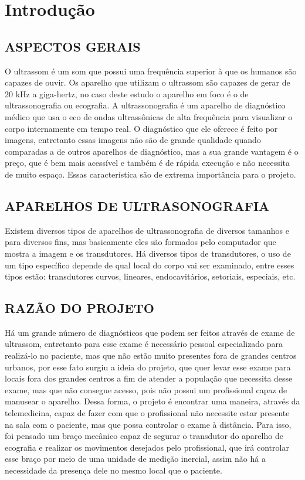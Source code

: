 \chapter{Introdução}

\section{ASPECTOS GERAIS}
O ultrassom é um som que possui uma frequência superior à que os humanos são capazes de ouvir. Os aparelho que utilizam o ultrassom são capazes de gerar de 20 kHz a giga-hertz, no caso deste estudo o aparelho em foco é o de ultrassonografia ou ecografia.
A ultrassonografia é um aparelho de diagnóstico médico que usa o eco de ondas ultrassônicas de alta frequência para visualizar o corpo internamente em tempo real. O diagnóstico que ele oferece é feito por imagens, entretanto essas imagens não são de grande qualidade quando comparadas a de outros aparelhos de diagnóstico, mas a sua grande vantagem é o preço, que é bem mais acessível e também é de rápida execução e não necessita de muito espaço. Essas característica são de extrema importância para o projeto.

\section{APARELHOS DE ULTRASONOGRAFIA}
Existem diversos tipos de aparelhos de ultrassonografia de diversos tamanhos e para diversos fins, mas basicamente eles são formados pelo computador que mostra a imagem e os transdutores. Há diversos tipos de transdutores, o uso de um tipo específico depende de qual local do corpo vai ser examinado, entre esses tipos estão: transdutores curvos, lineares, endocavitários, setoriais, especiais, etc. 

\section{RAZÃO DO PROJETO}
Há um grande número de diagnósticos que podem ser feitos através de exame de ultrassom, entretanto para esse exame é necessário pessoal especializado para realizá-lo no paciente, mas que não estão muito presentes fora de grandes centros urbanos, por esse fato surgiu a ideia do projeto, que quer levar esse exame para locais fora dos grandes centros a fim de atender a população que necessita desse exame, mas que não consegue acesso, pois não possui um profissional capaz de manusear o aparelho. Dessa forma, o projeto é encontrar uma maneira, através da telemedicina, capaz de fazer com que o profissional não necessite estar presente na sala com o paciente, mas que possa controlar o exame à distância. Para isso, foi pensado um braço mecânico capaz de segurar o transdutor do aparelho de ecografia e realizar os movimentos desejados pelo profissional, que irá controlar esse braço por meio de uma unidade de medição inercial, assim não há a necessidade da presença dele no mesmo local que o paciente.